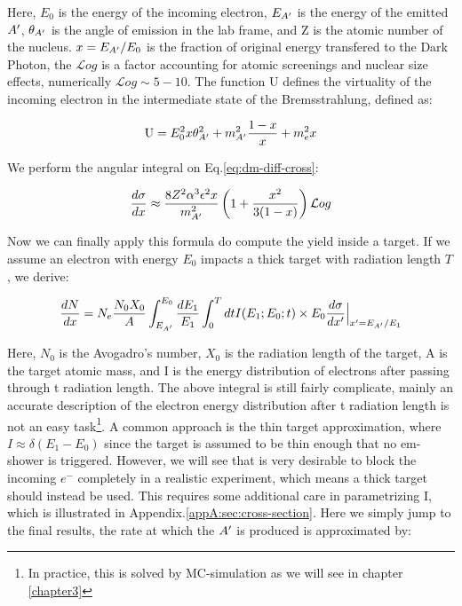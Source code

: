 Here, $E_0$ is the energy of the incoming electron, $E_{A'}$ is the energy of the emitted $A'$, $\theta_{A'}$ is the angle of emission in the lab frame, and Z is the atomic number of the nucleus. $x=E_{A'}/E_0$ is the fraction of original energy transfered to the Dark Photon, the $\mathcal{L}og$ is a factor accounting for atomic screenings and nuclear size effects, numerically $\mathcal{L}og \sim 5 - 10$. The function U defines the virtuality of the incoming electron in the intermediate state of the Bremsstrahlung, defined as:

\begin{equation}
  \label{eq:u-func}
  \textrm{U} = E^2_0 x \theta^2_{A'} + m^2_{A'} \frac{1 - x}{x} + m^2_e x
\end{equation}

We perform the angular integral on Eq.\ref{eq:dm-diff-cross}:

\begin{equation}
  \label{eq:dm-diff-cross-int}
  \frac{d\sigma}{dx} \approx \frac{8 Z^2 \alpha^3 \epsilon^2 x}{m^2_{A'}} \left( 1 + \frac{x^2}{3(1-x)} \right) \mathcal{L}og 
\end{equation}

Now we can finally apply this formula do compute the yield inside a target. If we assume an electron with energy $E_0$ impacts a thick target with radiation length $T$, we derive:

\begin{equation}
  \label{eq:dm-general-yield}
  \frac{dN}{dx} = N_e \frac{N_0 X_0}{A} \int_{E_{A'}}^{E_0} \frac{dE_1}{E_1} \int_0^T dt I(E_1;E_0;t) \times E_0 \frac{d\sigma}{dx'}\Big|_{x' = E_{A'}/E_1}
\end{equation}

Here, $N_0$ is the Avogadro's number, $X_0$ is the radiation length of the target, A is the target atomic mass, and I is the energy distribution of electrons after passing through t radiation length. The above integral is still fairly complicate, mainly an accurate description of the electron energy distribution after t radiation length is not an easy task\footnote{In practice, this is solved by MC-simulation as we will see in chapter \ref{chapter3}}. A common approach is the thin target approximation, where $I \approx \delta (E_1 - E_0)$ since the target is assumed to be thin enough that no em-shower is triggered. However, we will see that is very desirable to block the incoming $e^-$ completely in a realistic experiment, which means a thick target should instead be used. This requires some additional care in parametrizing I, which is illustrated in Appendix.\ref{appA:sec:cross-section}. Here we simply jump to the final results, the rate at which the $A'$ is produced is approximated by:

